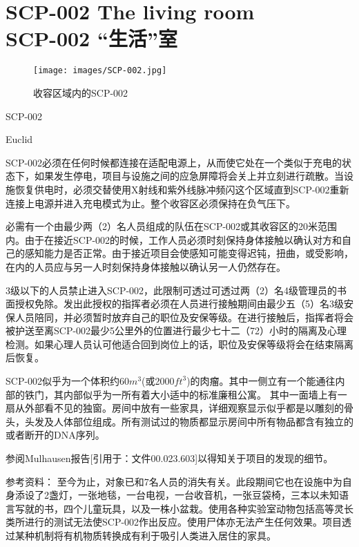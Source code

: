 \chapter[SCP-002 “生活”室]{
	SCP-002 The living room \\
	SCP-002 “生活”室
}

\label{chap:SCP-002}

\begin{figure}[H]
	\centering
	\texttt{[image: images/SCP-002.jpg]}
	\caption*{收容区域内的SCP-002}
\end{figure}

SCP-002

Euclid

SCP-002必须在任何时候都连接在适配电源上，从而使它处在一个类似于充电的状态下，如果发生停电，项目与设施之间的应急屏障将会关上并立刻进行疏散。当设施恢复供电时，必须交替使用X射线和紫外线脉冲频闪这个区域直到SCP-002重新连接上电源并进入充电模式为止。整个收容区必须保持在负气压下。

必需有一个由最少两（2）名人员组成的队伍在SCP-002或其收容区的20米范围内。由于在接近SCP-002的时候，工作人员必须时刻保持身体接触以确认对方和自己的感知能力是否正常。由于接近项目会使感知可能变得迟钝，扭曲，或受影响，在内的人员应与另一人时刻保持身体接触以确认另一人仍然存在。

3级以下的人员禁止进入SCP-002，此限制可透过可透过两（2）名4级管理员的书面授权免除。发出此授权的指挥者必须在人员进行接触期间由最少五（5）名3级安保人员陪同，并必须暂时放弃自己的职位及安保等级。在进行接触后，指挥者将会被护送至离SCP-002最少5公里外的位置进行最少七十二（72）小时的隔离及心理检测。如果心理人员认可他适合回到岗位上的话，职位及安保等级将会在结束隔离后恢复。

SCP-002似乎为一个体积约60$m^3$(或2000${ft}^3$)的肉瘤。其中一侧立有一个能通往内部的铁门，其内部似乎为一所有着大小适中的标准廉租公寓。 其中一面墙上有一扇从外部看不见的独窗。房间中放有一些家具，详细观察显示似乎都是以雕刻的骨头，头发及人体部位组成。所有测试过的物质都显示房间中所有物品都含有独立的或者断开的DNA序列。

参阅Mulhausen报告[引用于：文件00.023.603]以得知关于项目的发现的细节。

参考资料： 至今为止，对象已和7名人员的消失有关。此段期间它也在设施中为自身添设了2盏灯，一张地毯，一台电视，一台收音机，一张豆袋椅，三本以未知语言写就的书，四个儿童玩具，以及一株小盆栽。使用各种实验室动物包括高等灵长类所进行的测试无法使SCP-002作出反应。使用尸体亦无法产生任何效果。项目透过某种机制将有机物质转换成有利于吸引人类进入居住的家具。

